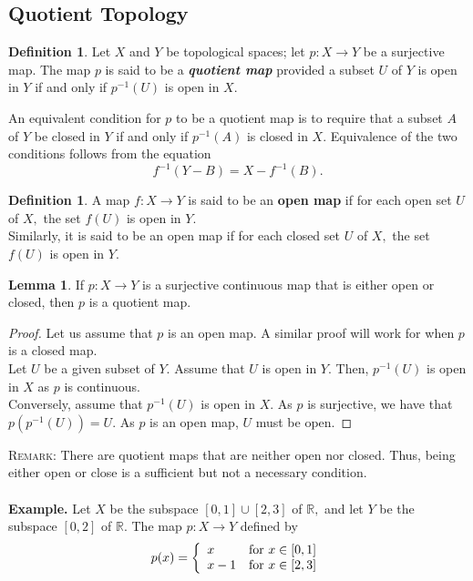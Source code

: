 \documentclass{article}
\theoremstyle{definition}
\newtheorem{lem}[theorem]{Lemma}
\newtheorem{defn}[theorem]{Definition}
\begin{document}
\subsection{Quotient Topology}
%
\begin{defn} 
  Let $X$ and $Y$ be topological spaces; let $p:X\longrightarrow Y$ be a surjective map. The map $p$ is said to be a \textbf{\emph{quotient map}} provided a subset $U$ of $Y$ is open in $Y$ if and only if $p^{-1}(U)$ is open in $X.$
\end{defn}
An equivalent condition for $p$ to be a quotient map is to require that a subset $A$ of $Y$ be closed in $Y$ if and only if $p^{-1}(A)$ is closed in $X.$ Equivalence of the two conditions follows from the equation
\[f^{-1}(Y - B) = X - f^{-1}(B).\]
\begin{defn}
  A map $f:X \longrightarrow Y$ is said to be an \textbf{open map} if for each open set $U$ of $X,$ the set $f(U)$ is open in $Y.$\\
  Similarly, it is said to be an open map if for each closed set $U$ of $X,$ the set $f(U)$ is open in $Y.$
\end{defn}
\begin{lem}\label{lem:closed maps quotient}
  If $p:X\longrightarrow Y$ is a surjective continuous map that is either open or closed, then $p$ is a quotient map.
\end{lem}
\begin{proof}
  Let us assume that $p$ is an open map. A similar proof will work for when $p$ is a closed map.\\
  Let $U$ be a given subset of $Y.$
  Assume that $U$ is open in $Y.$ Then, $p^{-1}(U)$ is open in $X$ as $p$ is continuous.\\
  Conversely, assume that $p^{-1}(U)$ is open in $X.$ As $p$ is surjective, we have that $p(p^{-1}(U)) = U.$ As $p$ is an open map, $U$ must be open.
\end{proof}
\textsc{Remark:} There are quotient maps that are neither open nor closed. Thus, being either open or close is a sufficient but not a necessary condition.\\\\
\textbf{Example.} Let $X$ be the subspace $[0, 1] \cup [2, 3]$ of $\mathbb{R},$ and let $Y$ be the subspace $[0, 2]$ of $\mathbb{R}.$ The map $p:X\longrightarrow Y$ defined by
\[p(x) = \left\{ %
\begin{array}{l r}
  x & \text{for } x \in [0, 1]\\
  x-1 & \text{for } x \in [2, 3] 
\end{array}
\right. \]
\end{document}
